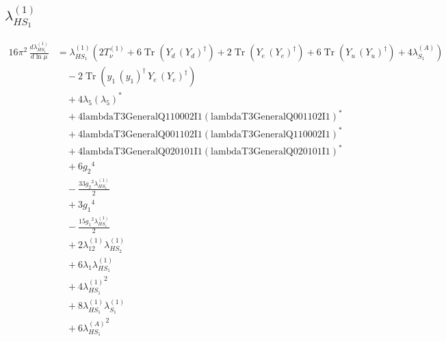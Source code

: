 \documentclass[10pt,a4paper]{article}
\begin{document}
\subsection*{$\lambda_{HS_1}^{(1)}$}
\begin{align*}
16\pi^2\,\frac{d \lambda_{HS_1}^{(1)}}{d\ln\mu} &={\lambda_{HS_1}^{(1)}} (2 T_{\nu}^{(1)}+6 \operatorname{Tr}\!\left({Y_d}\,\left({Y_d}\right)^{\dagger}\right)+2 \operatorname{Tr}\!\left({Y_e}\,\left({Y_e}\right)^{\dagger}\right)+6 \operatorname{Tr}\!\left({Y_u}\,\left({Y_u}\right)^{\dagger}\right)+4 {\lambda_{S_1}^{(A)}}) \\
&\quad -2 \operatorname{Tr}\!\left({y_1}\,\left({y_1}\right)^{\dagger}\,{Y_e}\,\left({Y_e}\right)^{\dagger}\right) \\
&\quad +4 {\lambda_5} \left({\lambda_5}\right)^{*} \\
&\quad +4 \text{lambdaT3GeneralQ110002I1} \left(\text{lambdaT3GeneralQ001102I1}\right)^{*} \\
&\quad +4 \text{lambdaT3GeneralQ001102I1} \left(\text{lambdaT3GeneralQ110002I1}\right)^{*} \\
&\quad +4 \text{lambdaT3GeneralQ020101I1} \left(\text{lambdaT3GeneralQ020101I1}\right)^{*} \\
&\quad +6 {g_2}^4 \\
&\quad -\frac{33 {g_2}^2 {\lambda_{HS_1}^{(1)}}}{2} \\
&\quad +3 {g_1}^4 \\
&\quad -\frac{15 {g_1}^2 {\lambda_{HS_1}^{(1)}}}{2} \\
&\quad +2 {\lambda_{12}^{(1)}} {\lambda_{HS_2}^{(1)}} \\
&\quad +6 {\lambda_1} {\lambda_{HS_1}^{(1)}} \\
&\quad +4 {\lambda_{HS_1}^{(1)}}^2 \\
&\quad +8 {\lambda_{HS_1}^{(1)}} {\lambda_{S_1}^{(1)}} \\
&\quad +6 {\lambda_{HS_1}^{(A)}}^2 \\
\end{align*}
\end{document}
